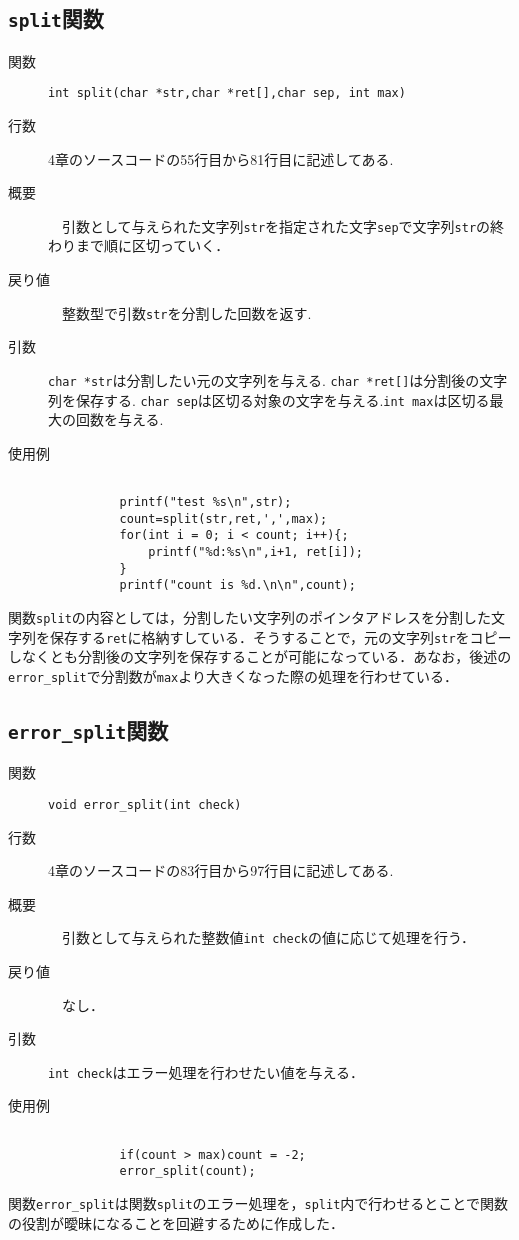 \documentclass[a4j,11pt]{jarticle}
\begin{document}
\subsection{\texttt{split}関数}
 \begin{description}
    \item[関数] \verb|int split(char *str,char *ret[],char sep, int max)|
    \item[行数]  4章のソースコードの55行目から81行目に記述してある.
    \item[概要]　引数として与えられた文字列\verb|str|を指定された文字\verb|sep|で文字列\verb|str|の終わりまで順に区切っていく．
    \item[戻り値]　整数型で引数\verb|str|を分割した回数を返す.
    \item[引数]  \verb|char *str|は分割したい元の文字列を与える. \verb|char *ret[]|は分割後の文字列を保存する. \verb|char sep|は区切る対象の文字を与える.\verb|int max|は区切る最大の回数を与える. 
    \item[使用例]
      \begin{verbatim}

          printf("test %s\n",str);
          count=split(str,ret,',',max);
          for(int i = 0; i < count; i++){;
              printf("%d:%s\n",i+1, ret[i]);
          }
          printf("count is %d.\n\n",count);
      \end{verbatim}
\end{description}
関数\verb|split|の内容としては，分割したい文字列のポインタアドレスを分割した文字列を保存する\verb|ret|に格納すしている．そうすることで，元の文字列\verb|str|をコピーしなくとも分割後の文字列を保存することが可能になっている．あなお，後述の\verb|error_split|で分割数が\verb|max|より大きくなった際の処理を行わせている．

\subsection{\texttt{error\_split}関数}
 \begin{description}
    \item[関数] \verb|void error_split(int check)|
    \item[行数]  4章のソースコードの83行目から97行目に記述してある.
    \item[概要]　引数として与えられた整数値\verb|int check|の値に応じて処理を行う．
    \item[戻り値]　なし．
    \item[引数]  \verb|int check|はエラー処理を行わせたい値を与える．
    \item[使用例]
      \begin{verbatim}

          if(count > max)count = -2;
          error_split(count);
      \end{verbatim}
\end{description}
関数\verb|error_split|は関数\verb|split|のエラー処理を，\verb|split|内で行わせるとことで関数の役割が曖昧になることを回避するために作成した．
\end{document}
